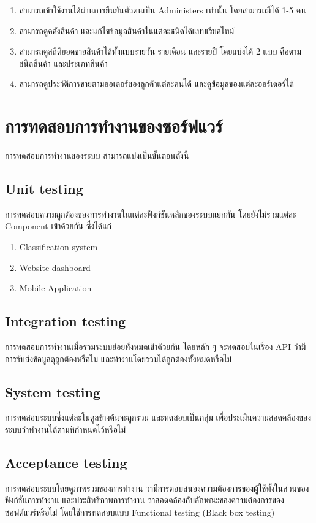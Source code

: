   \begin{enumerate}
    \item สามารถเข้าใช้งานได้ผ่านการยืนยันตัวตนเป็น Administers เท่านั้น โดยสามารถมีได้ 1-5 คน
    \item สามารถดูคลังสินค้า และแก้ไขข้อมูลสินค้าในแต่ละชนิดได้แบบเรียลไทม์
    \item สามารถดูสถิติยอดขายสินค้าได้ทั้งแบบรายวัน รายเดือน และรายปี โดยแบ่งได้ 2 แบบ คือตามชนิดสินค้า และประเภทสินค้า
    \item สามารถดูประวัติการขายตามออเดอร์ของลูกค้าแต่ละคนได้ และดูข้อมูลของแต่ละออร์เดอร์ได้
\end{enumerate}



 

\section{การทดสอบการทำงานของซอร์ฟแวร์}
การทดสอบการทำงานของระบบ สามารถแบ่งเป็นขั้นตอนดังนี้
\subsection{Unit testing}
การทดสอบความถูกต้องของการทำงานในแต่ละฟังก์ชันหลักของระบบแยกกัน โดยยังไม่รวมแต่ละ Component เข้าด้วยกัน ซึ่งได้แก่
\begin{enumerate}
  \item Classification system
  \item Website dashboard
  \item Mobile Application
\end{enumerate}

\subsection{Integration testing}
การทดสอบการทำงานเมื่อรวมระบบย่อยทั้งหมดเข้าด้วยกัน โดยหลัก ๆ
 จะทดสอบในเรื่อง API ว่ามีการรับส่งข้อมูลดุถูกต้องหรือไม่ และทำงานโดยรวมได้ถูกต้องทั้งหมดหรือไม่
\subsection{System testing}
การทดสอบระบบซึ่งแต่ละโมดูลข้างต้นจะถูกรวม และทดสอบเป็นกลุ่ม 
เพื่อประเมินความสอดคล้องของระบบว่าทำงานได้ตามที่กำหนดไว้หรือไม่
\subsection{Acceptance testing}
การทดสอบระบบโดยดูภาพรวมของการทำงาน ว่ามีการตอบสนองความต้องการของผู้ใช้ทั้งในส่วนของฟังก์ชันการทำงาน 
และประสิทธิภาพการทำงาน ว่าสอดคล้องกับลักษณะของความต้องการของซอฟต์แวร์หรือไม่ 
โดยใช้การทดสอบแบบ Functional testing (Black box testing)
 
